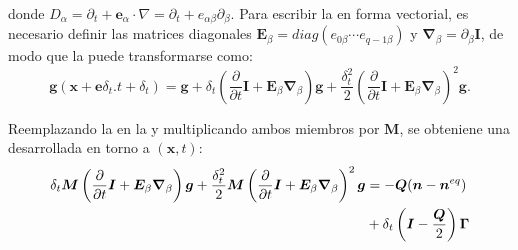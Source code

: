 donde $D_{\alpha} = \partial_t + \bm{e}_{\alpha} \cdot \nabla=\partial_t + e_{\alpha \beta} \partial_{\beta}$. Para escribir la  en forma vectorial, es necesario definir las matrices diagonales $\bm{E}_{\beta} = diag(e_{0\beta} \cdots e_{q-1\beta})$ y $\bm{\nabla}_{\beta} = \partial_{\beta} \bm{I}$, de modo que la  puede transformarse como:
\begin{equation}
	\bm{g}(\bm{x}+\bm{e}\delta_t. t+\delta_t) = \bm{g} 
	+ \delta_t\left( \dfrac{\partial}{\partial t} \bm{I} + \bm{E}_{\beta}\bm{\nabla}_{\beta} \right) \bm{g}
	+ \dfrac{\delta^2_t}{2} \left( \dfrac{\partial}{\partial t} \bm{I} + \bm{E}_{\beta}\bm{\nabla}_{\beta} \right)^2 \bm{g}.
	\label{eq:taylor_vec}
\end{equation}

Reemplazando la  en la  y multiplicando ambos miembros por $\bm{M}$, se obteniene una \lbe{} desarrollada en torno a $(\bm{x},t)$:
\begin{equation}
	\begin{aligned}
	\delta_t \bm{M}\left( \dfrac{\partial}{\partial t} \bm{I} + \bm{E}_{\beta}\bm{\nabla}_{\beta} \right) \bm{g} + \dfrac{\delta^2_t}{2} \bm{M}\left( \dfrac{\partial}{\partial t} \bm{I} + \bm{E}_{\beta}\bm{\nabla}_{\beta} \right)^2 \bm{g} 
	&= -\bm{Q}(\bm{n} - \bm{n}^{eq}) \\
	& + \delta_t \left( \bm{I}-\dfrac{\bm{Q}}{2}\right) \bm{\Gamma}
	\end{aligned}
	\label{eq:taylor_vec_2}
\end{equation}

